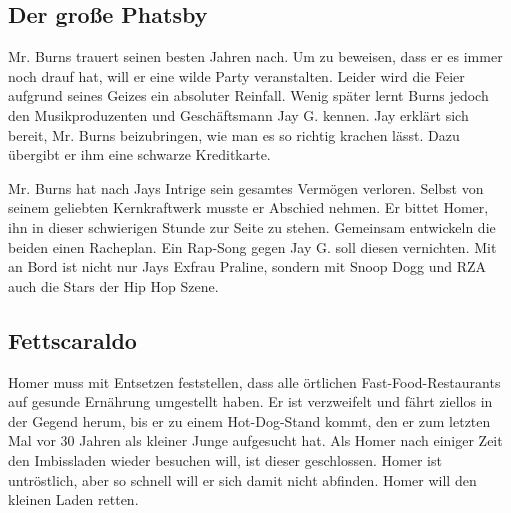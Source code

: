 
\subsection{Der große Phatsby}
Mr. Burns trauert seinen besten Jahren nach. Um zu beweisen, dass er es immer noch drauf hat, will er eine wilde Party veranstalten. Leider wird die Feier aufgrund seines Geizes ein absoluter Reinfall. Wenig später lernt Burns jedoch den Musikproduzenten und Geschäftsmann Jay G. kennen. Jay erklärt sich bereit, Mr. Burns beizubringen, wie man es so richtig krachen lässt. Dazu übergibt er ihm eine schwarze Kreditkarte.

Mr. Burns hat nach Jays Intrige sein gesamtes Vermögen verloren. Selbst von seinem geliebten Kernkraftwerk musste er Abschied nehmen. Er bittet Homer, ihn in dieser schwierigen Stunde zur Seite zu stehen. Gemeinsam entwickeln die beiden einen Racheplan. Ein Rap-Song gegen Jay G. soll diesen vernichten. Mit an Bord ist nicht nur Jays Exfrau Praline, sondern mit Snoop Dogg und RZA auch die Stars der Hip Hop Szene.


\subsection{Fettscaraldo}
Homer muss mit Entsetzen feststellen, dass alle örtlichen Fast-Food-Restaurants auf gesunde Ernährung umgestellt haben. Er ist verzweifelt und fährt ziellos in der Gegend herum, bis er zu einem Hot-Dog-Stand kommt, den er zum letzten Mal vor 30 Jahren als kleiner Junge aufgesucht hat. Als Homer nach einiger Zeit den Imbissladen wieder besuchen will, ist dieser geschlossen. Homer ist untröstlich, aber so schnell will er sich damit nicht abfinden. Homer will den kleinen Laden retten.

